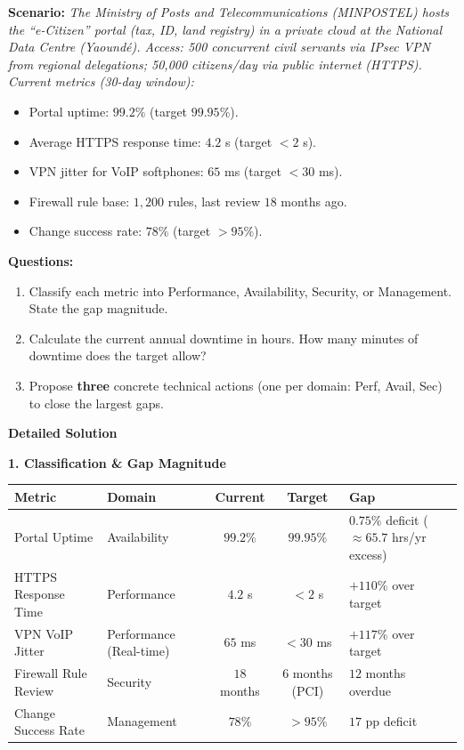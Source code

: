 \documentclass[11pt]{article}
\begin{document}
\begin{exoresolu}
\textbf{Scenario:} \textit{The Ministry of Posts and Telecommunications (MINPOSTEL) hosts the ``e-Citizen'' portal (tax, ID, land registry) in a private cloud at the National Data Centre (Yaound\'e). Access: 500 concurrent civil servants via IPsec VPN from regional delegations; 50,000 citizens/day via public internet (HTTPS). Current metrics (30-day window):}
\begin{itemize}
    \item Portal uptime: $99.2\%$ (target $99.95\%$).
    \item Average HTTPS response time: $4.2$ s (target $< 2$ s).
    \item VPN jitter for VoIP softphones: $65$ ms (target $< 30$ ms).
    \item Firewall rule base: $1,200$ rules, last review $18$ months ago.
    \item Change success rate: $78\%$ (target $> 95\%$).
\end{itemize}

\textbf{Questions:}
\begin{enumerate}
    \item Classify each metric into Performance, Availability, Security, or Management. State the gap magnitude.
    \item Calculate the current annual downtime in hours. How many minutes of downtime does the target allow?
    \item Propose \textbf{three} concrete technical actions (one per domain: Perf, Avail, Sec) to close the largest gaps.
\end{enumerate}
\tcblower
\textbf{Detailed Solution}

\noindent\textbf{1. Classification \& Gap Magnitude}

\begin{center}
\begin{tabularx}{\linewidth}{|l|l|c|c|X|}
\hline
\rowcolor{popblueL}
\textbf{Metric} & \textbf{Domain} & \textbf{Current} & \textbf{Target} & \textbf{Gap} \\
\hline
Portal Uptime & Availability & $99.2\%$ & $99.95\%$ & $0.75\%$ deficit ($\approx 65.7$ hrs/yr excess) \\
\hline
HTTPS Response Time & Performance & $4.2$ s & $< 2$ s & $+110\%$ over target \\
\hline
VPN VoIP Jitter & Performance (Real-time) & $65$ ms & $< 30$ ms & $+117\%$ over target \\
\hline
Firewall Rule Review & Security & $18$ months & $6$ months (PCI) & $12$ months overdue \\
\hline
Change Success Rate & Management & $78\%$ & $> 95\%$ & $17$ pp deficit \\
\hline
\end{tabularx}
\end{center}


\end{exoresolu}
\end{document}
